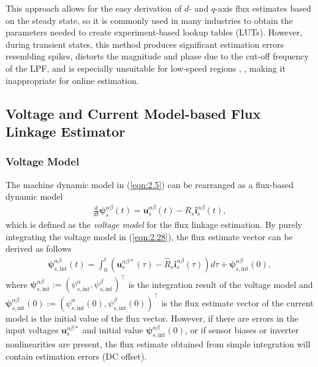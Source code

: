 This approach allows for the easy derivation of \(d\)- and \(q\)-axis flux estimates based on the steady state, so it is commonly used in many industries to obtain the parameters needed to create experiment-based lookup tables (LUTs). However, during transient states, this method produces significant estimation errors resembling spikes, distorts the magnitude and phase due to the cut-off frequency of the LPF, and is especially unsuitable for low-speed regions \cite{c2.3_7}, \cite{c2.3_8}, making it inappropriate for online estimation.

\subsection{Voltage and Current Model-based Flux Linkage Estimator} \label{sec2:2.3.2}
\subsubsection{Voltage Model}
The machine dynamic model in (\ref{eqn:2.5}) can be rearranged as a flux-based dynamic model
\begin{align}\label{eqn:2.28}
\frac{d}{dt}\bm{\psi}^{\alpha\beta}_s(t) = \mathbf{u}^{\alpha\beta}_s(t) - R_s \mathbf{i}^{\alpha\beta}_s(t),
\end{align}
which is defined as the \emph{voltage model} \cite{c2.1_1} for the flux linkage estimation. By purely integrating the voltage model in (\ref{eqn:2.28}), the flux estimate vector can be derived as follows 
\begin{align}\label{eqn:2.29}
\bm{\psi}^{\alpha\beta}_{s,\text{int}}(t) = \int_{0}^{t} \left( \bm{u}^{\alpha\beta*}_{s}(\tau) - \hat R_s \bm{i}^{\alpha\beta}_s(\tau) \right) d\tau + \bm{\psi}^{\alpha\beta}_{s,\text{int}}(0),
\end{align}
where \(\bm{{\psi}}^{\alpha\beta}_{s,{\text{int}}}:=({\psi}^{\alpha}_{s,{\text{int}}},{\psi}^{\beta}_{s,{\text{int}}})^\top\) is the integration result of the voltage model and \(\bm{{\psi}}^{\alpha\beta}_{s,{\text{int}}}(0):=({\psi}^{\alpha}_{s,{\text{int}}}(0),{\psi}^{\beta}_{s,{\text{int}}}(0))^\top\) is the flux estimate vector of the current model is the initial value of the flux vector. However, if there are errors in the input voltages $\bm{u}^{\alpha\beta*}_{s}$ and initial value $\bm{\psi}^{\alpha\beta}_{s,\text{int}}(0)$, or if sensor biases or inverter nonlinearities are present, the flux estimate obtained from simple integration will contain estimation errors (DC offset). 

